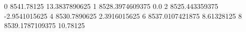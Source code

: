 0 8541.78125 13.3837890625
1 8528.3974609375 0.0
2 8525.443359375 -2.9541015625
4 8530.7890625 2.3916015625
6 8537.0107421875 8.61328125
8 8539.1787109375 10.78125
